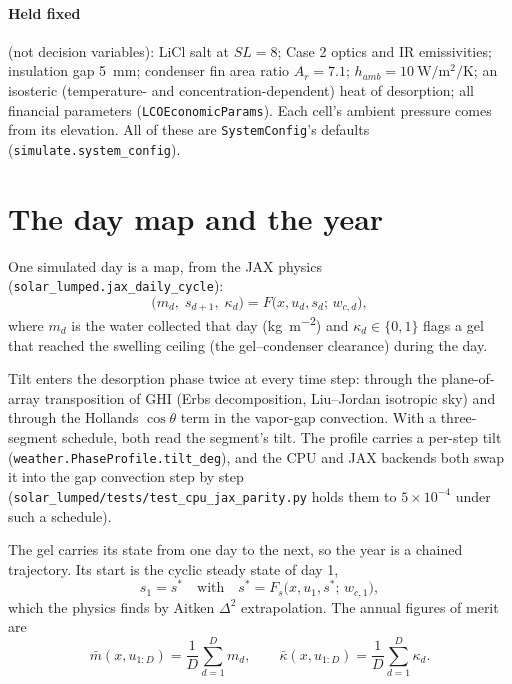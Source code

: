 \documentclass[11pt]{article}
\newcommand{\code}[1]{\texttt{#1}}
\begin{document}
\paragraph{Held fixed} (not decision variables): LiCl salt at $SL = 8$; Case 2 optics and IR
emissivities; insulation gap \SI{5}{\milli\metre}; condenser fin area ratio $A_r = 7.1$;
$h_{amb} = \SI{10}{\watt\per\square\metre\per\kelvin}$; an isosteric (temperature- and
concentration-dependent) heat of desorption; all financial parameters
(\code{LCOEconomicParams}). Each cell's ambient pressure comes from its elevation. All of
these are \code{SystemConfig}'s defaults (\code{simulate.system\_config}).

\section{The day map and the year}

One simulated day is a map, from the JAX physics (\code{solar\_lumped.jax\_daily\_cycle}):
\begin{equation}
\bigl(m_d,\; s_{d+1},\; \kappa_d\bigr) = F\bigl(x, u_d, s_d;\, w_{c,d}\bigr),
\label{eq:daymap}
\end{equation}
where $m_d$ is the water collected that day (\si{\kilogram\per\square\metre}) and
$\kappa_d \in \{0,1\}$ flags a gel that reached the swelling ceiling (the gel--condenser
clearance) during the day.

Tilt enters the desorption phase twice at every time step: through the plane-of-array
transposition of GHI (Erbs decomposition, Liu--Jordan isotropic sky) and through the
Hollands $\cos\theta$ term in the vapor-gap convection. With a three-segment schedule, both
read the segment's tilt. The profile carries a per-step tilt
(\code{weather.PhaseProfile.tilt\_deg}), and the CPU and JAX backends both swap it into the
gap convection step by step (\code{solar\_lumped/tests/test\_cpu\_jax\_parity.py} holds them
to $5\times10^{-4}$ under such a schedule).

The gel carries its state from one day to the next, so the year is a chained trajectory.
Its start is the cyclic steady state of day 1,
\begin{equation}
s_1 = s^\ast \quad\text{with}\quad s^\ast = F_s\bigl(x, u_1, s^\ast;\, w_{c,1}\bigr),
\label{eq:cyclic}
\end{equation}
which the physics finds by Aitken $\Delta^2$ extrapolation. The annual figures of merit are
\begin{equation}
\bar m(x, u_{1:D}) = \frac{1}{D}\sum_{d=1}^{D} m_d,
\qquad
\bar\kappa(x, u_{1:D}) = \frac{1}{D}\sum_{d=1}^{D} \kappa_d .
\end{equation}
\end{document}
